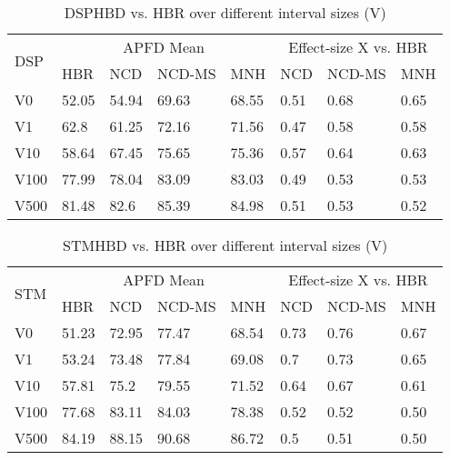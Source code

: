 \documentclass[1p]{elsarticle}
\begin{document}
\begin{table} [H]
\centering
\caption {DSP\textendash HBD vs. HBR over different interval sizes (V)}
\label{table:rq3_p4}
  \begin{tabular}{|l|l|l|l|l|l|l|l|}
    \hline
    \multirow{2}{*}{DSP} &
      \multicolumn{4}{c|}{APFD Mean} &
      \multicolumn{3}{c|}{Effect-size X vs. HBR} \\
    & HBR & NCD & NCD-MS & MNH & NCD & NCD-MS & MNH \\
    \hline
    \hline
	V0&52.05&54.94&69.63&68.55&0.51&0.68\cellcolor{Gray}&0.65\cellcolor{Gray}\\
	\hline
	V1&62.8&61.25&72.16&71.56&0.47&0.58\cellcolor{Gray}&0.58\cellcolor{Gray}\\
	\hline
	V10&58.64&67.45&75.65&75.36&0.57\cellcolor{Gray}&0.64\cellcolor{Gray}&0.63\cellcolor{Gray}\\
	\hline
	V100&77.99&78.04&83.09&83.03&0.49&0.53&0.53\\
	\hline
	V500&81.48&82.6&85.39&84.98&0.51&0.53\cellcolor{Gray}&0.52\cellcolor{Gray}\\
	\hline
  \end{tabular}
\end{table}

\begin{table} [H]
\centering
\caption {STM\textendash HBD vs. HBR over different interval sizes (V)}
\label{table:rq3_p5}
  \begin{tabular}{|l|l|l|l|l|l|l|l|}
    \hline
    \multirow{2}{*}{STM} &
      \multicolumn{4}{c|}{APFD Mean} &
      \multicolumn{3}{c|}{Effect-size X vs. HBR} \\
    & HBR & NCD & NCD-MS & MNH & NCD & NCD-MS & MNH \\
    \hline
    \hline
	V0&51.23&72.95&77.47&68.54&0.73\cellcolor{Gray}&0.76\cellcolor{Gray}&0.67\cellcolor{Gray}\\
	\hline
	V1&53.24&73.48&77.84&69.08&0.7\cellcolor{Gray}&0.73\cellcolor{Gray}&0.65\cellcolor{Gray}\\
	\hline
	V10&57.81&75.2&79.55&71.52&0.64\cellcolor{Gray}&0.67\cellcolor{Gray}&0.61\cellcolor{Gray}\\
	\hline
	V100&77.68&83.11&84.03&78.38&0.52\cellcolor{Gray}&0.52\cellcolor{Gray}&0.50\\
	\hline
	V500&84.19&88.15&90.68&86.72&0.5\cellcolor{Gray}&0.51\cellcolor{Gray}&0.50\cellcolor{Gray}\\
	\hline
  \end{tabular}
\end{table}
\end{document}
